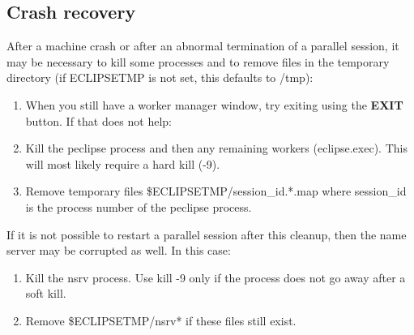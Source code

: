 \subsection{Crash recovery}
After a machine crash or after an abnormal termination of a parallel
session, it may be necessary to kill some processes and to remove files
in the temporary directory
(if ECLIPSETMP is not set, this defaults to /tmp):
\begin{enumerate}
\item When you still have a worker manager window, try exiting using
the {\bf EXIT} button.  If that does not help:
\item Kill the peclipse process and then any remaining workers
(eclipse.exec). This will most likely require a hard kill (-9).
\item Remove temporary
files \$ECLIPSETMP/session_id.*.map where session_id
is the process number of the peclipse process.
\end{enumerate}
If it is not possible to restart a parallel session after this cleanup,
then the name server may be corrupted as well. In this case:
\begin{enumerate}
\item Kill the nsrv process. Use kill -9 only if the process does not go away
after a soft kill.
\item Remove \$ECLIPSETMP/nsrv* if these files still exist.
\end{enumerate}

